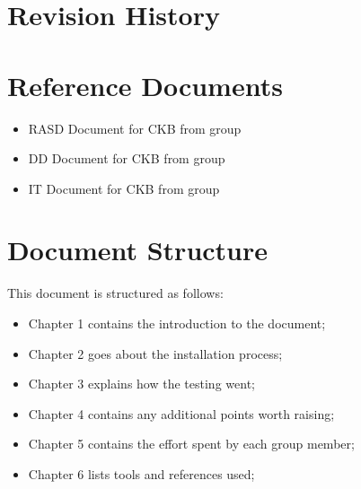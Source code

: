 \section{Revision History}

\section{Reference Documents}

\begin{itemize}
    \item RASD Document for \ac{CKB} from group
    \item DD Document for \ac{CKB} from group
    \item IT Document for \ac{CKB} from group
\end{itemize}

\section{Document Structure}
This document is structured as follows:
\begin{itemize}
    \item Chapter 1 contains the introduction to the document;
    \item Chapter 2 goes about the installation process;
    \item Chapter 3 explains how the testing went;
    \item Chapter 4 contains any additional points worth raising;
    \item Chapter 5 contains the effort spent by each group member;
    \item Chapter 6 lists tools and references used;
\end{itemize}
